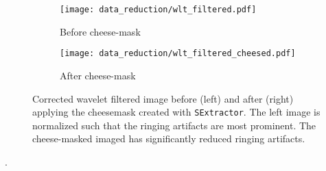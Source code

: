 \begin{figure}[htbp]
    \centering
    \begin{subfigure}[b]{0.48\textwidth}
        \centering
        \texttt{[image: data\_reduction/wlt\_filtered.pdf]}
        \caption{Before cheese-mask}
        \label{fig:wlt_filtered}
    \end{subfigure}
    \hfill
    \begin{subfigure}[b]{0.48\textwidth}
        \centering
        \texttt{[image: data\_reduction/wlt\_filtered\_cheesed.pdf]}
        \caption{After cheese-mask}
        \label{fig:wvl_filtered_cheesed}
    \end{subfigure}
    \caption{Corrected wavelet filtered image before (left) and after (right) applying the cheesemask created with \texttt{SExtractor}. The left image is normalized such that the ringing artifacts are most prominent. The cheese-masked imaged has significantly reduced ringing artifacts.}
    \label{fig:comparison_wvl_filtered}
\end{figure}





.